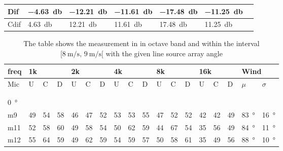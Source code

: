 \begin{table}[H]
\begin{tabular}{l|l|l|l|l|l|l|l|l|l|l|l|l|l|l|l|l|l}
Dif & \multicolumn{3}{l|}{\SI{-4.63}{\decibel}} & \multicolumn{3}{l|}{\SI{-12.21}{\decibel}} & \multicolumn{3}{l|}{\SI{-11.61}{\decibel}} & \multicolumn{3}{l|}{\SI{-17.48}{\decibel}} & \multicolumn{3}{l|}{\SI{-11.25}{\decibel}}   &  \multicolumn{2}{l}{}    \\  \hline 
Cdif & \multicolumn{3}{l|}{\SI{4.63}{\decibel}} & \multicolumn{3}{l|}{\SI{12.21}{\decibel}} & \multicolumn{3}{l|}{\SI{11.61}{\decibel}} & \multicolumn{3}{l|}{\SI{17.48}{\decibel}} & \multicolumn{3}{l|}{\SI{11.25}{\decibel}}  &   \multicolumn{2}{l}{}                          
\end{tabular}
\label{meas:result_cross_7_8}
\end{table}


\begin{table}[H]
\centering
\caption{The table shows the measurement in in octave band and within the interval $[\SI{8}{\meter\per\second},\, \SI{9}{\meter\per\second}[ $ with the given line source array angle}
\setlength\tabcolsep{5pt} %
\begin{tabular}{l|l|l|l|l|l|l|l|l|l|l|l|l|l|l|l|l|l}
freq & \multicolumn{3}{l|}{1k} & \multicolumn{3}{l|}{2k} & \multicolumn{3}{l|}{4k} & \multicolumn{3}{l|}{8k} & \multicolumn{3}{l|}{16k}   &  \multicolumn{2}{l}{Wind}                      \\ \hline
Mic  & U      & C      & D     & U      & C      & D     & U      & C      & D     & U      & C      & D     & U  & C  & D & $\mu$ & $\sigma$ \\ \hline
 & \multicolumn{3}{l|}{} & \multicolumn{3}{l|}{} & \multicolumn{3}{l|}{} & \multicolumn{3}{l|}{} & \multicolumn{3}{l|}{} &      \multicolumn{2}{l}{}                        \\ 
 \multicolumn{18}{l}{ } \\  
\SI{0}{\degree}   & \multicolumn{3}{l|}{} & \multicolumn{3}{l|}{} & \multicolumn{3}{l|}{} & \multicolumn{3}{l|}{} & \multicolumn{3}{l|}{} & \multicolumn{2}{l}{}   \\  \hline
m9   & 49     & 54     & 58    & 46     & 47     & 52    & 53     & 53     & 55    & 47     & 52     & 52    & 42 & 42 & 49  & \SI{83}{\degree} & \SI{16}{\degree}  \\
m11  & 52     & 58     & 60    & 49     & 58     & 54    & 50     & 62     & 59    & 44     & 67     & 54    & 35 & 56 & 49   & \SI{84}{\degree} & \SI{11}{\degree}  \\
m12  & 55     & 64     & 59    & 49     & 62     & 59    & 54     & 59     & 57    & 50     & 58     & 61    & 35 & 49 & 56   & \SI{88}{\degree} & \SI{10}{\degree}  \\

\end{tabular}
\end{table}

